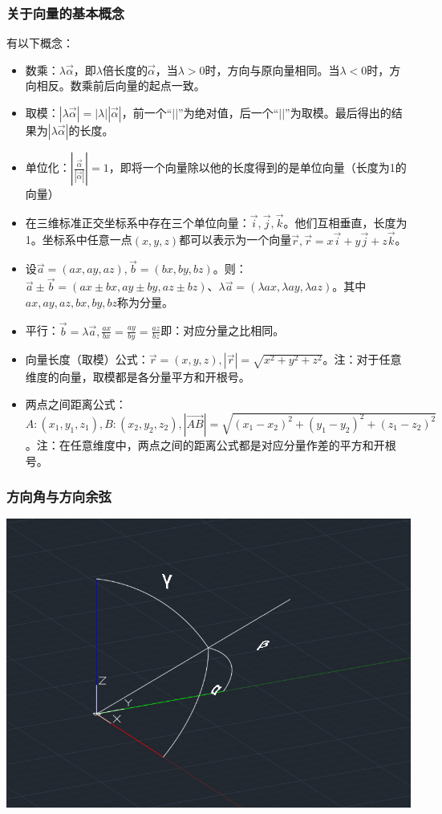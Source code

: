 \documentclass[UTF8]{ctexbook}
\begin{document}
{{{    \subsubsection{关于向量的基本概念}{
      有以下概念：
      \begin{itemize}
        \item 数乘：$\lambda \vec{\alpha}$，即$\lambda$倍长度的$\vec{\alpha}$，当$\lambda > 0$时，方向与原向量相同。当$\lambda < 0$时，方向相反。数乘前后向量的起点一致。
        \item 取模：$|\lambda\vec{\alpha}| = |\lambda||\vec{\alpha}|$，前一个“$||$”为绝对值，后一个“$||$”为取模。最后得出的结果为$|\lambda\vec{\alpha}|$的长度。
        \item 单位化：$|\frac{\vec{\alpha}}{|\vec{\alpha}|}| = 1$，即将一个向量除以他的长度得到的是单位向量（长度为1的向量）
        \item 在三维标准正交坐标系中存在三个单位向量：$\vec{i},\vec{j},\vec{k}$。他们互相垂直，长度为1。坐标系中任意一点$(x,y,z)$都可以表示为一个向量$\vec{r},\vec{r} = x\vec{i} + y\vec{j} + z\vec{k}$。
        \item 设$\vec{a} = (ax,ay,az),\vec{b} = (bx,by,bz)$。则：$\vec{a} \pm \vec{b} = (ax \pm bx,ay \pm by,az \pm bz)$、$\lambda\vec{a} = (\lambda ax,\lambda ay,\lambda az)$。其中$ax,ay,az,bx,by,bz$称为分量。
        \item 平行：$\vec{b} = \lambda\vec{a},\frac{ax}{bx} = \frac{ay}{by} = \frac{az}{bz}$即：对应分量之比相同。
        \item 向量长度（取模）公式：$\vec{r} = (x,y,z),|\vec{r}| = \sqrt{x^2 + y^2 + z^2}$。注：对于任意维度的向量，取模都是各分量平方和开根号。
        \item 两点之间距离公式：$A:(x_1,y_1,z_1),B:(x_2,y_2,z_2),|\vec{AB}| = \sqrt{(x_1 - x_2)^2 + (y_1 -y_2)^2 + (z_1 - z_2)^2}$。注：在任意维度中，两点之间的距离公式都是对应分量作差的平方和开根号。
      \end{itemize}
    }%

    \subsubsection{方向角与方向余弦}{
      \includegraphics[scale = 0.5]{resources/directionAngle.png}

}}}}
\end{document}
